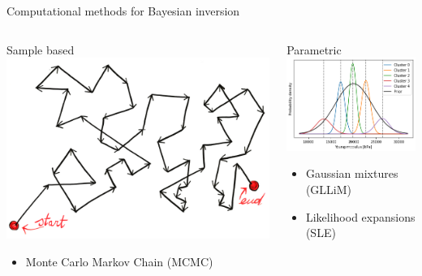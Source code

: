 \documentclass[dvipsnames]{beamer}
\begin{document}
	\begin{frame}{Computational methods for Bayesian inversion}
	\begin{columns}
	\begin{column}{.5\textwidth}
	\begin{block}{Sample based}
	\includegraphics[width=\textwidth]{images/random_walk.png}
	\begin{itemize}
	\item Monte Carlo Markov Chain (MCMC)
	\end{itemize}
	\end{block}
	\end{column}
	\begin{column}{.5\textwidth}
	\begin{block}{Parametric}
		\includegraphics[width=\textwidth]{graphs/prior/K=5_all_details.png}
	\begin{itemize}
	\item Gaussian mixtures (GLLiM)
	\item Likelihood expansions (SLE)
	\end{itemize}
	\end{block}
	\end{column}
	\end{columns}
	\end{frame}
	
\end{document}
